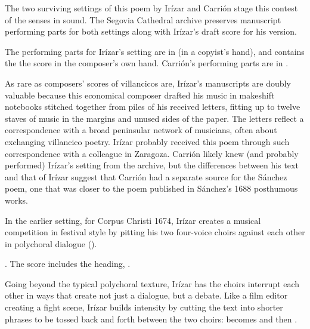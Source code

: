 The two surviving settings of this poem by Irízar and Carrión stage this
contest of the senses in sound.
The Segovia Cathedral archive preserves manuscript performing parts for both
settings along with Irízar's draft score for his version.%
\begin{Footnote}
    The performing parts for Irízar's setting are in  (in a
    copyist's hand), and  contains the the score in the
    composer's own hand.
    Carrión's performing parts are in .
\end{Footnote}
As rare as composers' scores of villancicos are, Irízar's manuscripts are doubly
valuable because this economical composer drafted his music in makeshift
notebooks stitched together from piles of his received letters, fitting up to
twelve staves of music in the margins and unused sides of the paper.%
    \Autocites
    {LopezCalo:IrizarLetters1}
    {Olarte:Irizar}
The letters reflect a correspondence with a broad peninsular network of
musicians, often about exchanging villancico poetry.%
    \Autocite{Rodriguez:Networks}
Irízar probably received this poem through such correspondence with a colleague
in Zaragoza.
Carrión likely knew (and probably performed) Irízar's setting from the archive,
but the differences between his text and that of Irízar suggest that Carrión had
a separate source for the Sánchez poem, one that was closer to the poem
published in Sánchez's 1688 posthumous works.%
    \Autocite[171--172]{Sanchez:LiraPoetica}


In the earlier setting, for Corpus Christi 1674, Irízar creates a musical
competition in festival style by pitting his two four-voice choirs against each
other in polychoral dialogue ().%
\begin{Footnote}
    \Autocite[133--148]{Cashner:WLSCM32}.  
    The score includes the heading, .
\end{Footnote}
Going beyond the typical polychoral texture, Irízar has the choirs interrupt
each other in ways that create not just a dialogue, but a debate.
Like a film editor creating a fight scene, Irízar builds intensity by cutting
the text into shorter phrases to be tossed back and forth between the two
choirs:  becomes  and then
.

